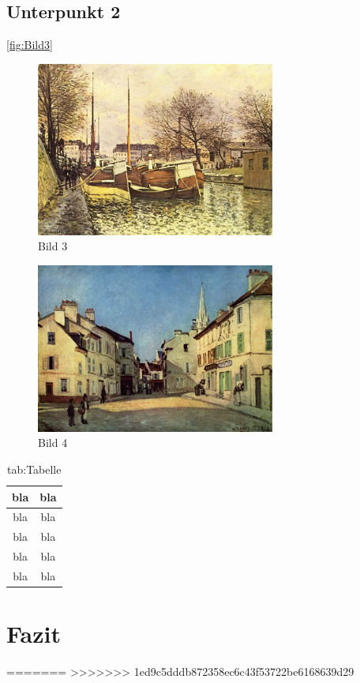 \documentclass[
	A4paper,
	DIV=9,
	BCOR7mm,
	smallheadings,
	headinclude,
	footinclude,
	headsepline,
	parindent,
	german,
	captions=tableheading,
	abstracton
	]{scrreprt}
\begin{document}
\blindtext[1]{}\autocite{:Keshk_2014}
\section{Unterpunkt 2}
\blindtext[1]{}\autocite{:Aydin_2009}

\blindtext[1]{}\autoref{fig:Bild3}
\blindtext[1]{}\autocite{:Muelhardt_2013}
\begin{figure}[htbp]
\begin{center}
\includegraphics[width=0.7\textwidth]{Abbildungen/Bild3.jpg}
\caption{Bild 3}
\label{fig:Bild3}
\end{center}
\end{figure}

\blindtext[2]{}\autocite{:Geschwinde_Rauschdrogen}
\begin{figure}[htbp]
\begin{center}
\includegraphics[width=0.7\textwidth]{Abbildungen/Bild4.jpg}
\caption{Bild 4}
\label{fig:Bild4}
\end{center}
\end{figure}

\blindtext[1]{}
\begin{table}[]
\caption{tab:Tabelle}
\begin{center}
\begin{tabular}{|c|c|}
\hline
bla & bla \\
\hline
\hline
bla & bla \\
bla & bla \\
bla & bla \\
bla & bla \\
\hline
\end{tabular}
\end{center}
\label{default}
\end{table}%

\chapter{Fazit}
\blindtext[1]{}

\blindtext[2]{}

\blindtext[2]{}

\blindtext[1]{}
=======
>>>>>>> 1ed9c5dddb872358ec6c43f53722be6168639d29

\printbibliography
\end{document}
